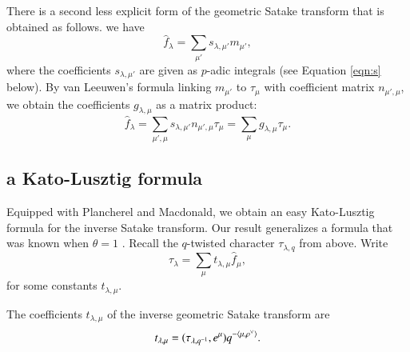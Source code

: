 There is a second less explicit form of the geometric Satake transform that is obtained as follows.
we have
\[
\hat f_\lambda = \sum_{\mu'} s_{\lambda,\mu'} m_{\mu'},
\]
where the coefficients $s_{\lambda,\mu'}$ are given as $p$-adic integrals (see Equation \ref{eqn:s} below).
By van Leeuwen's formula linking $m_{\mu'}$ to $\tau_\mu$ with coefficient matrix $n_{\mu',\mu}$, 
we obtain the coefficients $g_{\lambda,\mu}$ as a matrix product:
\begin{equation}
\hat f_\lambda = \sum_{\mu',\mu} s_{\lambda,\mu'} n_{\mu',\mu} \tau_{\mu} = \sum_{\mu} g_{\lambda,\mu} \tau_\mu.
\end{equation}

\subsection{a Kato-Lusztig formula}

Equipped with Plancherel and Macdonald, we obtain an easy Kato-Lusztig formula for the inverse Satake transform.
Our result generalizes a formula that was
 known when $\theta=1$ \cite{kato1982spherical} \cite{lusztig1983singularities}.
Recall the $q$-twisted character  $\tau_{\lambda,q}$ from above.
Write 
\[
\tau_\lambda = \sum_\mu t_{\lambda,\mu}  \hat f_\mu,
\]
for some constants $t_{\lambda,\mu}$.

\begin{theorem}
The coefficients $t_{\lambda,\mu}$ of the inverse geometric Satake transform are 
\[
t_{\lambda,\mu} =  (\tau_{\lambda,q^{-1}},e^\mu) q^{-\langle{\mu,\rho^\vee}\rangle}.
\]
\end{theorem}

